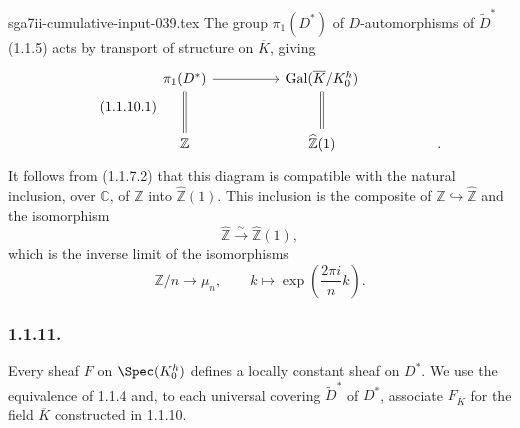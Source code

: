 \begin{filecontents*}{sga7ii-cumulative-input-039.tex}
The group $\pi_1(D^*)$ of $D$-automorphisms of
$\widetilde D^*$ (1.1.5) acts by transport of structure on
$\overline K$, giving
\begin{equation}\tag{1.1.10.1}
\begin{tikzcd}[column sep=huge, row sep=large]
\pi_1(D^*) \arrow[r] \arrow[d, equal]
  & \operatorname{Gal}(\overline K/K_0^h) \arrow[d, equal]
  & {} \\
\mathbb Z
  & \widehat{\mathbb Z}(1)
  & .
\end{tikzcd}
\end{equation}
It follows from (1.1.7.2) that this diagram is compatible with the
natural inclusion, over $\mathbb C$, of $\mathbb Z$ into
$\widehat{\mathbb Z}(1)$.  This inclusion is the composite of
$\mathbb Z\hookrightarrow\widehat{\mathbb Z}$ and the isomorphism
\[
\widehat{\mathbb Z}\xrightarrow{\ \sim\ }
\widehat{\mathbb Z}(1),
\]
which is the inverse limit of the isomorphisms
\[
\mathbb Z/n\longrightarrow\mu_n,
\qquad
k\longmapsto\exp\left(\frac{2\pi i}{n}k\right).
\]

\subsubsection*{1.1.11.}
Every sheaf $F$ on $\Spec(K_0^h)$ defines a locally constant sheaf on
$D^*$.  We use the equivalence of 1.1.4 and, to each universal
covering $\widetilde D^*$ of $D^*$, associate $F_{\overline K}$ for
the field $\overline K$ constructed in 1.1.10.
\end{filecontents*}
